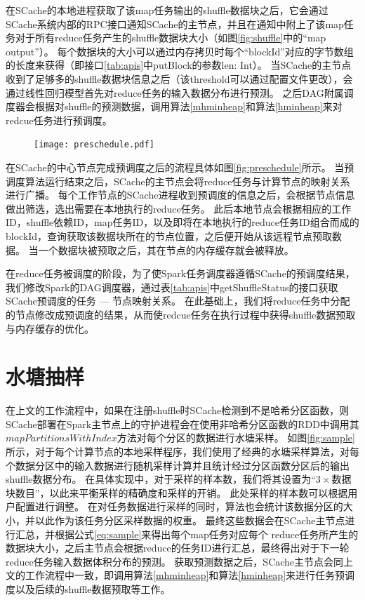 在SCache的本地进程获取了该map任务输出的shuffle数据块之后，它会通过SCache系统内部的RPC接口通知SCache的主节点，并且在通知中附上了该map任务对于所有reduce任务产生的shuffle数据块大小（如图\ref{fig:shuffle}中的“map output”）。
每个数据块的大小可以通过内存拷贝时每个“blockId”对应的字节数组的长度来获得（即接口\ref{tab:apis}中putBlock的参数len: Int）。
当SCache的主节点收到了足够多的shuffle数据块信息之后（该threshold可以通过配置文件更改），会通过线性回归模型首先对reduce任务的输入数据分布进行预测。
之后DAG附属调度器会根据对shuffle的预测数据，调用算法\ref{mhminheap}和算法\ref{hminheap}来对redcue任务进行预调度。

\begin{figure}[!htp]
	\centering
	\texttt{[image: preschedule.pdf]}
\end{figure}

在SCache的中心节点完成预调度之后的流程具体如图\ref{fig:preschedule}所示。
当预调度算法运行结束之后，SCache的主节点会将reduce任务与计算节点的映射关系进行广播。
每个工作节点的SCache进程收到预调度的信息之后，会根据节点信息做出筛选，选出需要在本地执行的reduce任务。
此后本地节点会根据相应的工作ID，shuffle依赖ID，map任务ID，以及即将在本地执行的reduce任务ID组合而成的blockId，查询获取该数据块所在的节点位置，之后便开始从该远程节点预取数据。
当一个数据块被预取之后，其在节点的内存缓存就会被释放。

在reduce任务被调度的阶段，为了使Spark任务调度器遵循SCache的预调度结果，我们修改Spark的DAG调度器，通过表\ref{tab:apis}中getShuffleStatus的接口获取SCache预调度的任务 --- 节点映射关系。
在此基础上，我们将reduce任务中分配的节点修改成预调度的结果，从而使redcue任务在执行过程中获得shuffle数据预取与内存缓存的优化。

\section{水塘抽样}
\label{sec:sampling}

在上文的工作流程中，如果在注册shuffle时SCache检测到不是哈希分区函数，则SCache部署在Spark主节点上的守护进程会在使用非哈希分区函数的RDD中调用其$mapPartitionsWithIndex$\cite{sparksource}方法对每个分区的数据进行水塘采样。
如图\ref{fig:sample}所示，对于每个计算节点的本地采样程序，我们使用了经典的水塘采样算法\cite{reservoir}，对每个数据分区中的输入数据进行随机采样计算并且统计经过分区函数分区后的输出shuffle数据分布。
在具体实现中，对于采样的样本数，我们将其设置为“$3 \times $数据块数目”，以此来平衡采样的精确度和采样的开销。
此处采样的样本数可以根据用户配置进行调整。
在对任务数据进行采样的同时，算法也会统计该数据分区的大小，并以此作为该任务分区采样数据的权重。
最终这些数据会在SCache主节点进行汇总，并根据公式\ref{eq:sample}来得出每个map任务对应每个
reduce任务所产生的数据块大小，之后主节点会根据reduce的任务ID进行汇总，最终得出对于下一轮reduce任务输入数据体积分布的预测。
获取预测数据之后，SCache主节点会同上文的工作流程中一致，即调用算法\ref{mhminheap}和算法\ref{hminheap}来进行任务预调度以及后续的shuffle数据预取等工作。

